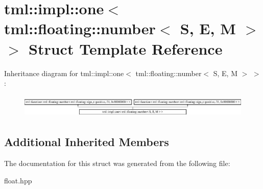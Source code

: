 \hypertarget{structtml_1_1impl_1_1one_3_01tml_1_1floating_1_1number_3_01S_00_01E_00_01M_01_4_01_4}{\section{tml\+:\+:impl\+:\+:one$<$ tml\+:\+:floating\+:\+:number$<$ S, E, M $>$ $>$ Struct Template Reference}
\label{structtml_1_1impl_1_1one_3_01tml_1_1floating_1_1number_3_01S_00_01E_00_01M_01_4_01_4}
}
Inheritance diagram for tml\+:\+:impl\+:\+:one$<$ tml\+:\+:floating\+:\+:number$<$ S, E, M $>$ $>$\+:\begin{figure}[H]
\begin{center}
\leavevmode
\includegraphics[height=1.126761cm]{structtml_1_1impl_1_1one_3_01tml_1_1floating_1_1number_3_01S_00_01E_00_01M_01_4_01_4}
\end{center}
\end{figure}
\subsection*{Additional Inherited Members}


The documentation for this struct was generated from the following file\+:\begin{DoxyCompactItemize}
\item 
float.\+hpp\end{DoxyCompactItemize}
